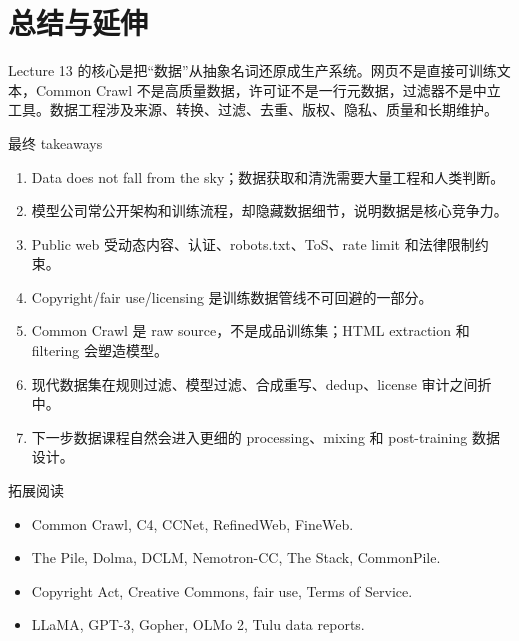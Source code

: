 \section{总结与延伸}

Lecture 13 的核心是把“数据”从抽象名词还原成生产系统。网页不是直接可训练文本，Common Crawl 不是高质量数据，许可证不是一行元数据，过滤器不是中立工具。数据工程涉及来源、转换、过滤、去重、版权、隐私、质量和长期维护。

\begin{importantbox}{最终 takeaways}
\begin{enumerate}
    \item Data does not fall from the sky；数据获取和清洗需要大量工程和人类判断。
    \item 模型公司常公开架构和训练流程，却隐藏数据细节，说明数据是核心竞争力。
    \item Public web 受动态内容、认证、robots.txt、ToS、rate limit 和法律限制约束。
    \item Copyright/fair use/licensing 是训练数据管线不可回避的一部分。
    \item Common Crawl 是 raw source，不是成品训练集；HTML extraction 和 filtering 会塑造模型。
    \item 现代数据集在规则过滤、模型过滤、合成重写、dedup、license 审计之间折中。
    \item 下一步数据课程自然会进入更细的 processing、mixing 和 post-training 数据设计。
\end{enumerate}
\end{importantbox}

\begin{knowledgebox}{拓展阅读}
\begin{itemize}
    \item Common Crawl, C4, CCNet, RefinedWeb, FineWeb.
    \item The Pile, Dolma, DCLM, Nemotron-CC, The Stack, CommonPile.
    \item Copyright Act, Creative Commons, fair use, Terms of Service.
    \item LLaMA, GPT-3, Gopher, OLMo 2, Tulu data reports.
\end{itemize}
\end{knowledgebox}


